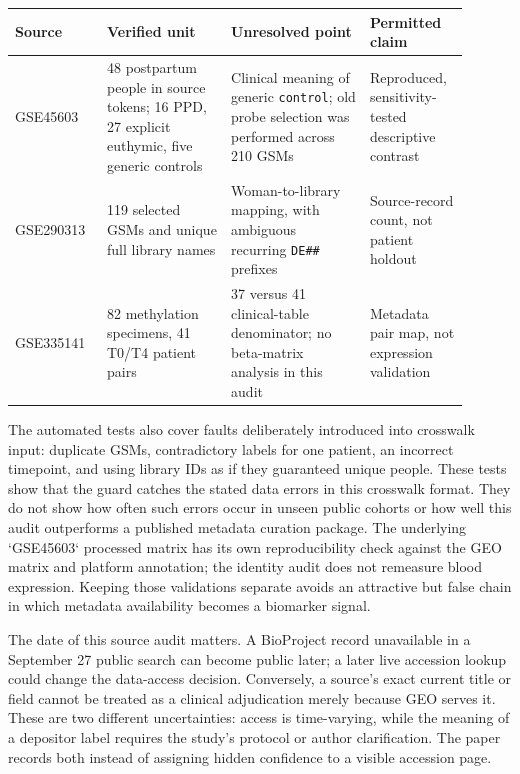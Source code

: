 \documentclass[11pt,a4paper]{article}
\begin{document}
\begin{center}\small\begin{tabular}{p{0.18\linewidth}p{0.25\linewidth}p{0.29\linewidth}p{0.18\linewidth}}
Source & Verified unit & Unresolved point & Permitted claim\\\hline
GSE45603 & 48 postpartum people in source tokens; 16 PPD, 27 explicit euthymic, five generic controls & Clinical meaning of generic \texttt{control}; old probe selection was performed across 210 GSMs & Reproduced, sensitivity-tested descriptive contrast\\
GSE290313 & 119 selected GSMs and unique full library names & Woman-to-library mapping, with ambiguous recurring \texttt{DE\#\#} prefixes & Source-record count, not patient holdout\\
GSE335141 & 82 methylation specimens, 41 T0/T4 patient pairs & 37 versus 41 clinical-table denominator; no beta-matrix analysis in this audit & Metadata pair map, not expression validation\\
\end{tabular}\end{center}

The automated tests also cover faults deliberately introduced into crosswalk input: duplicate GSMs, contradictory labels for one patient, an incorrect timepoint, and using library IDs as if they guaranteed unique people. These tests show that the guard catches the stated data errors in this crosswalk format. They do not show how often such errors occur in unseen public cohorts or how well this audit outperforms a published metadata curation package. The underlying `GSE45603` processed matrix has its own reproducibility check against the GEO matrix and platform annotation; the identity audit does not remeasure blood expression. Keeping those validations separate avoids an attractive but false chain in which metadata availability becomes a biomarker signal.

The date of this source audit matters. A BioProject record unavailable in a September 27 public search can become public later; a later live accession lookup could change the data-access decision. Conversely, a source's exact current title or field cannot be treated as a clinical adjudication merely because GEO serves it. These are two different uncertainties: access is time-varying, while the meaning of a depositor label requires the study's protocol or author clarification. The paper records both instead of assigning hidden confidence to a visible accession page.
\end{document}
